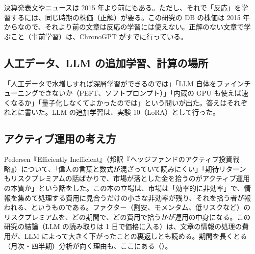 決算発表文やニュースは 2015 年より前にもある。ただし、それで「反応」を学習するには、同じ時期の株価（正解）が要る。この研究の DB の株価は 2015 年からなので、それより前の文章は反応の学習には使えない。正解のない文章で学ぶこと（事前学習）は、ChronoGPT がすでに行っている。

\subsection{人工データ、LLM の追加学習、計算の場所}

「人工データで水増しすれば深層学習ができるのでは」「LLM 自体をファインチューニングできないか（PEFT、ソフトプロンプト）」「内蔵の GPU も使えば速くなるか」「量子化しなくてよかったのでは」という問いが出た。答えはそれぞれとに書いた。LLM の追加学習は、実験 10（LoRA）として行った。

\subsection{アクティブ運用の考え方}

Pedersen『Efficiently Inefficient』（邦訳『ヘッジファンドのアクティブ投資戦略』）について、「偉人の言葉と数式が混ざっていて読みにくい」「期待リターンもリスクプレミアムの話ばかりで、市場が落とした金を拾うのがアクティブ運用の本質か」という話をした。この本の立場は、市場は「効率的に非効率」で、情報を集めて処理する費用に見合うだけの小さな非効率が残り、それを拾う者が報われる、というものである。ファクター（割安、モメンタム、低リスクなど）のリスクプレミアムを、どの期間で、どの費用で拾うかが運用の中身になる。この研究の結論（LLM の読み取りは 1 日で価格に入る）は、文章の情報の処理の費用が、LLM によって大きく下がったことの裏返しとも読める。期間を長くとる（月次・四半期）分析が向く理由も、ここにある（）。
